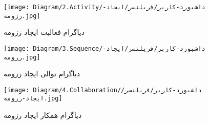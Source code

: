 \begin{figure}[H]
	\centering
	\texttt{[image: Diagram/2.Activity/داشبورد-کاربر/فریلنسر/ایجاد-رزومه.jpg]}
	\caption{دیاگرام فعالیت ایجاد رزومه}
	\label{fig:a:ایجاد-رزومه}
\end{figure}
\begin{figure}[H]
	\centering
	\texttt{[image: Diagram/3.Sequence/داشبورد-کاربر/فریلنسر/ایجاد-رزومه.jpg]}
	\caption{دیاگرام توالی ایجاد رزومه}
	\label{fig:s:ایجاد-رزومه}
\end{figure}
\begin{figure}[H]
	\centering
	\texttt{[image: Diagram/4.Collaboration/داشبورد-کاربر/فریلنسر/ایجاد-رزومه.jpg]}
	\caption{دیاگرام همکار ایجاد رزومه}
	\label{fig:c:ایجاد-رزومه}
\end{figure}